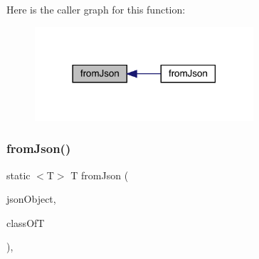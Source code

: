 Here is the caller graph for this function\+:
\nopagebreak
\begin{figure}[H]
\begin{center}
\leavevmode
\includegraphics[width=230pt]{classcom_1_1toast_1_1android_1_1gamebase_1_1base_1_1_value_object_ae6655c88c20a9a8406dc11b46250ac7b_icgraph}
\end{center}
\end{figure}
\mbox{\label{classcom_1_1toast_1_1android_1_1gamebase_1_1base_1_1_value_object_ab83c4196ee2e3f11553bbe0f04dc2101}} 
\subsubsection{\texorpdfstring{from\+Json()}{fromJson()}\hspace{0.1cm}{\footnotesize\ttfamily [2/3]}}
{\footnotesize\ttfamily static $<$T$>$ T from\+Json (\begin{DoxyParamCaption}\item[{@Non\+Null J\+S\+O\+N\+Object}]{json\+Object,  }\item[{Class$<$ T $>$}]{class\+OfT }\end{DoxyParamCaption})\hspace{0.3cm}{\ttfamily [static]}, {\ttfamily [inherited]}}

